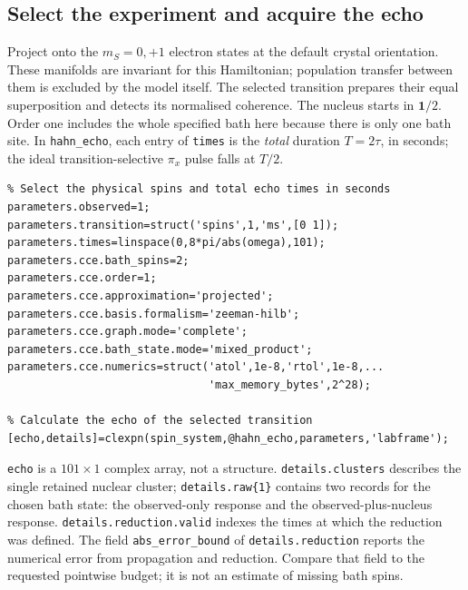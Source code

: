 \documentclass[11pt,a4paper]{article}
\newcommand{\code}[1]{\texttt{#1}}
\begin{document}
\subsection{Select the experiment and acquire the echo}
Project onto the $m_S=0,+1$ electron states at the default crystal orientation. These manifolds are invariant for this Hamiltonian; population transfer between them is excluded by the model itself. The selected transition prepares their equal superposition and detects its normalised coherence. The nucleus starts in $\mathbf{1}/2$. Order one includes the whole specified bath here because there is only one bath site. In \code{hahn\_echo}, each entry of \code{times} is the \emph{total} duration $T=2\tau$, in seconds; the ideal transition-selective $\pi_x$ pulse falls at $T/2$.
\begin{lstlisting}
% Select the physical spins and total echo times in seconds
parameters.observed=1;
parameters.transition=struct('spins',1,'ms',[0 1]);
parameters.times=linspace(0,8*pi/abs(omega),101);
parameters.cce.bath_spins=2;
parameters.cce.order=1;
parameters.cce.approximation='projected';
parameters.cce.basis.formalism='zeeman-hilb';
parameters.cce.graph.mode='complete';
parameters.cce.bath_state.mode='mixed_product';
parameters.cce.numerics=struct('atol',1e-8,'rtol',1e-8,...
                               'max_memory_bytes',2^28);

% Calculate the echo of the selected transition
[echo,details]=clexpn(spin_system,@hahn_echo,parameters,'labframe');
\end{lstlisting}

\code{echo} is a $101\times1$ complex array, not a structure. \code{details.clusters} describes the single retained nuclear cluster; \code{details.raw\{1\}} contains two records for the chosen bath state: the observed-only response and the observed-plus-nucleus response. \code{details.reduction.valid} indexes the times at which the reduction was defined. The field \code{abs\_error\_bound} of \code{details.reduction} reports the numerical error from propagation and reduction. Compare that field to the requested pointwise budget; it is not an estimate of missing bath spins.
\end{document}
